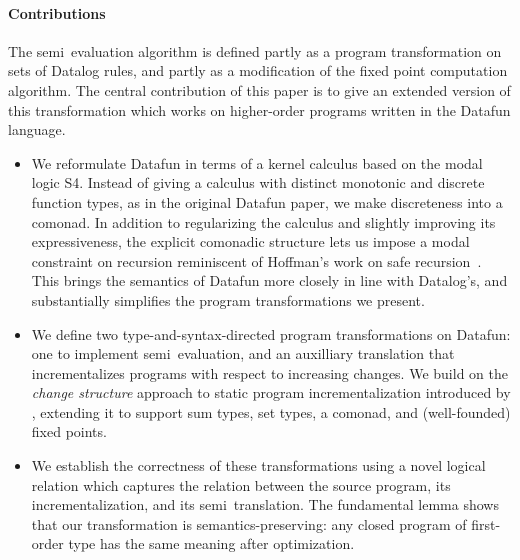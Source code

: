 \paragraph{Contributions} The semi\naive\ evaluation algorithm is
defined partly as a program transformation on sets of Datalog rules,
and partly as a modification of the fixed point computation algorithm.
The central contribution of this paper is to give an extended version
of this transformation which works on higher-order programs written
in the Datafun language.

\begin{itemize}
\item We reformulate Datafun in terms of a kernel calculus based on
  the modal logic S4. Instead of giving a calculus with distinct
  monotonic and discrete function types, as in the original Datafun
  paper, we make discreteness into a comonad. In addition to
  regularizing the calculus and slightly improving its expressiveness,
  the explicit comonadic structure lets us impose a modal constraint
  on recursion reminiscent of Hoffman's work on safe
  recursion~\cite{hofmann-safe-recursion}. This brings the semantics
  of Datafun more closely in line with Datalog's, and substantially
  simplifies the program transformations we present.
  

\item We define two type-and-syntax-directed program transformations on Datafun:
  one to implement semi\naive\ evaluation, and an auxilliary translation that
  incrementalizes programs with respect to increasing changes. We build on the
  \emph{change structure} approach to static program incrementalization
  introduced by \citet{incremental}, extending it to support sum types, set
  types, a comonad, and (well-founded) fixed points.

\item We establish the correctness of these transformations using a novel
  logical relation which captures the relation between the source program, its
  incrementalization, and its semi\naive\ translation. The fundamental lemma
  shows that our transformation is semantics-preserving: any closed program of
  first-order type has the same meaning after optimization.


\end{itemize}
